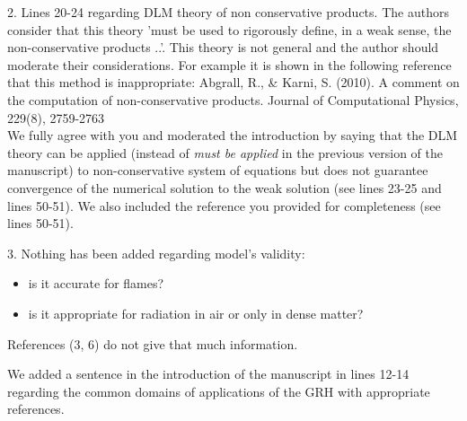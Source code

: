 \documentclass{article}
\begin{document}
{\color{blue}
 2. Lines 20-24 regarding DLM theory of non conservative products. The authors consider that this theory 'must be used to rigorously define, in a weak sense, the non-conservative products ..'. This theory is not general and the author should moderate their considerations. For example it is shown in the following reference that this method is inappropriate:
Abgrall, R., \& Karni, S. (2010). A comment on the computation of non-conservative products. Journal of Computational Physics, 229(8), 2759-2763\\}
We fully agree with you and moderated the introduction by saying that the DLM theory can be applied (instead of \emph{must be applied} in the previous version of the manuscript) to non-conservative system of equations but does not guarantee convergence of the numerical solution to the weak solution (see lines 23-25 and lines 50-51). We also included the reference you provided for completeness (see lines 50-51).
\bigskip

{\color{blue}
3. Nothing has been added regarding model's validity:
\begin{itemize}
\item is it accurate for flames?
\item is it appropriate for radiation in air or only in dense matter?
\end{itemize}
References (3, 6) do not give that much information.\\}
We added a sentence in the introduction of the manuscript in lines 12-14 regarding the common domains of applications of the GRH with appropriate references.
\end{document}
